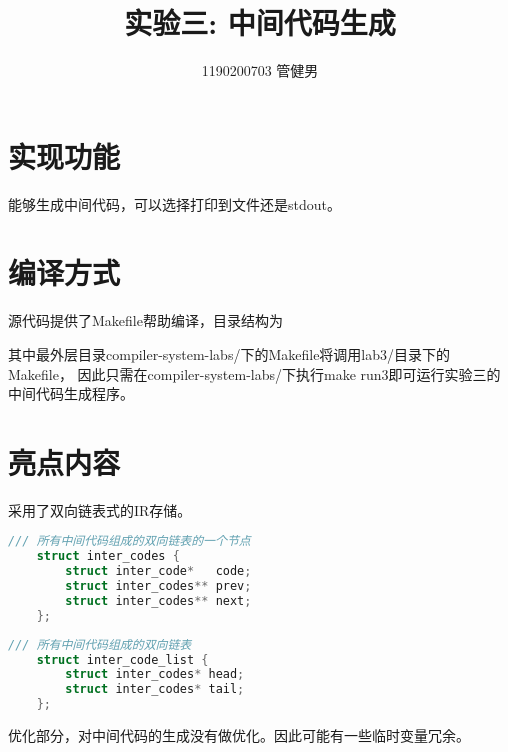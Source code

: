 \documentclass{article}
\title{实验三: 中间代码生成}
\author{1190200703 管健男}
\date{}
\begin{document}
\maketitle


\section{实现功能}

能够生成中间代码，可以选择打印到文件还是stdout。

\section{编译方式}

源代码提供了Makefile帮助编译，目录结构为

\begin{figure}[H]
    \centering
    \begin{minipage}{0.4\linewidth}
    \end{minipage}
\end{figure}

其中最外层目录compiler-system-labs/下的Makefile将调用lab3/目录下的Makefile，
因此只需在compiler-system-labs/下执行make run3即可运行实验三的中间代码生成程序。

\section{亮点内容}

采用了双向链表式的IR存储。

\begin{lstlisting}[language=C, caption=双向链表节点结构体声明]
    /// 所有中间代码组成的双向链表的一个节点
    struct inter_codes {
        struct inter_code*   code;
        struct inter_codes** prev;
        struct inter_codes** next;
    };
\end{lstlisting}

\begin{lstlisting}[language=C, caption=双向链表节点结构体声明]
    /// 所有中间代码组成的双向链表
    struct inter_code_list {
        struct inter_codes* head;
        struct inter_codes* tail;
    };
\end{lstlisting}

优化部分，对中间代码的生成没有做优化。因此可能有一些临时变量冗余。
\end{document}

